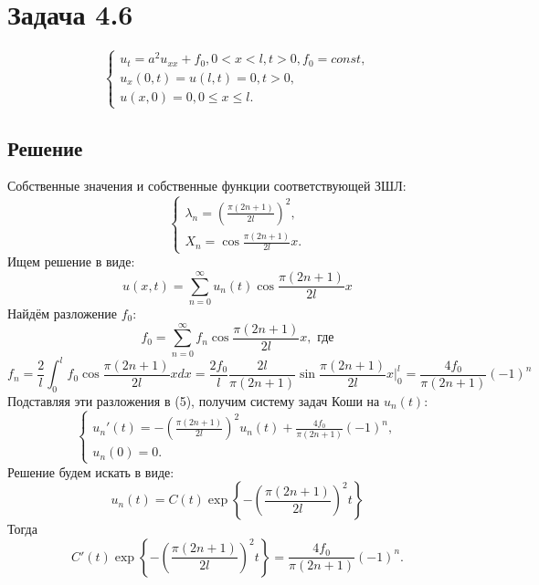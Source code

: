 \documentclass[11pt]{article}
\begin{document}
\section{Задача 4.6}
\label{sec:orgedc39b2}
\begin{equation}
\begin{cases}
u_t = a^2u_{xx} + f_0, 0 < x < l, t > 0, f_0 = const, \\
u_x(0, t) = u(l, t) = 0, t > 0, \\
u(x, 0) = 0, 0 \leq x \leq l.
\end{cases}
\end{equation}
\subsection{Решение}
\label{sec:org61a8eab}
Собственные значения и собственные функции соответствующей ЗШЛ:
\begin{equation*}
\begin{cases}
\lambda_n = \left(\frac{\pi(2n + 1)}{2l}\right)^2, \\
X_n = \cos\frac{\pi(2n + 1)}{2l}x.
\end{cases}
\end{equation*}
Ищем решение в виде:
\begin{equation*}
u(x, t) = \sum_{n = 0}^{\infty}u_n(t)\cos\frac{\pi(2n + 1)}{2l}x
\end{equation*}
Найдём разложение $f_0$:
\begin{equation*}
f_0 = \sum_{n = 0}^{\infty}f_n\cos\frac{\pi(2n + 1)}{2l}x, \text{ где}
\end{equation*}
\begin{equation*}
f_n = \frac2l\int_0^lf_0\cos\frac{\pi(2n + 1)}{2l}xdx =
\frac{2f_0}{l}\frac{2l}{\pi(2n + 1)}\sin\frac{\pi(2n + 1)}{2l}x\bigg|_0^l =
\frac{4f_0}{\pi(2n + 1)}(-1)^n
\end{equation*}
Подставляя эти разложения в (5), получим систему задач Коши на $u_n(t)$:
\begin{equation}
\begin{cases}
u_n'(t) = -\left(\frac{\pi(2n + 1)}{2l}\right)^2u_n(t) + \frac{4f_0}{\pi(2n + 1)}(-1)^n, \\
u_n(0) = 0.
\end{cases}
\end{equation}
Решение будем искать в виде:
\begin{equation*}
u_n(t) = C(t)\exp\left\{-\left(\frac{\pi(2n + 1)}{2l}\right)^2t\right\}
\end{equation*}
Тогда
\begin{equation*}
C'(t)\exp\left\{-\left(\frac{\pi(2n + 1)}{2l}\right)^2t\right\} = \frac{4f_0}{\pi(2n + 1)}(-1)^n.
\end{equation*}
\end{document}

